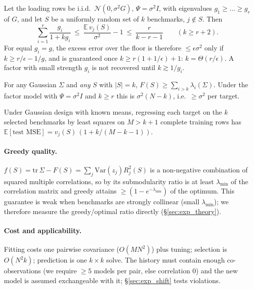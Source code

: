 \begin{proposition}\label{prop:random}
Let the loading rows be i.i.d.\ $\mathcal N(0,\sigma^2G)$, $\Psi=\sigma^2I$, with eigenvalues $g_1\ge\dots\ge g_r$ of $G$, and let $S$ be a uniformly random set of $k$ benchmarks, $j\notin S$. Then
\[
 \sum_{i=1}^r\frac{g_i}{1+k g_i}\ \le\ \frac{\mathbb{E}\,v_j(S)}{\sigma^2}-1\ \le\ \frac{r}{k-r-1}\qquad(k\ge r+2).
\]
For equal $g_i=g$, the excess error over the floor is therefore $\le\epsilon\sigma^2$ only if $k\ge r/\epsilon-1/g$, and is guaranteed once $k\ge r(1+1/\epsilon)+1$: $k=\Theta(r/\epsilon)$. A factor with small strength $g_i$ is not recovered until $k\gtrsim 1/g_i$.
\end{proposition}

\begin{proposition}\label{prop:tail}
For any Gaussian $\Sigma$ and \emph{any} $S$ with $|S|=k$, $F(S)\ge\sum_{i>k}\lambda_i(\Sigma)$. Under the factor model with $\Psi=\sigma^2 I$ and $k\ge r$ this is $\sigma^2(N-k)$, i.e.\ $\ge\sigma^2$ per target.
\end{proposition}

\begin{proposition}\label{prop:ols}
Under Gaussian design with known means, regressing each target on the $k$ selected benchmarks by least squares on $M>k+1$ complete training rows has $\mathbb{E}[\text{test MSE}]=v_j(S)\,(1+k/(M-k-1))$.
\end{proposition}

\paragraph{Greedy quality.} $f(S)=\mathrm{tr}\,\Sigma-F(S)=\sum_j\mathrm{Var}(z_j)R^2_j(S)$ is a non-negative combination of squared multiple correlations, so by \citet{das2011submodular} its submodularity ratio is at least $\lambda_{\min}$ of the correlation matrix and greedy attains $\ge(1-e^{-\lambda_{\min}})$ of the optimum. This guarantee is weak when benchmarks are strongly collinear (small $\lambda_{\min}$); we therefore measure the greedy/optimal ratio directly (\S\ref{sec:exp_theory}).

\paragraph{Cost and applicability.} Fitting costs one pairwise covariance ($O(MN^2)$) plus tuning; selection is $O(N^2k)$; prediction is one $k\times k$ solve. The history must contain enough co-observations (we require $\ge5$ models per pair, else correlation 0) and the new model is assumed exchangeable with it; \S\ref{sec:exp_shift} tests violations.
